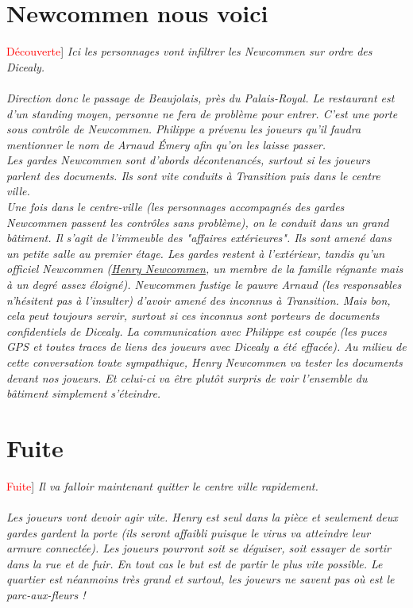 \documentclass[10pt,a4paper,twocolumn]{article}
\newenvironment{lAbstract}[1]{{[}\textcolor{red}{#1}{]}\itshape}{\\ \\}
\begin{document}
\section{Newcommen nous voici}
\begin{lAbstract}{Découverte}
Ici les personnages vont infiltrer les Newcommen sur ordre des Dicealy.
\end{lAbstract}
Direction donc le passage de Beaujolais, près du Palais-Royal. Le restaurant est d'un standing moyen, personne ne fera de problème pour entrer. C'est une porte sous contrôle de Newcommen. Philippe a prévenu les joueurs qu'il faudra mentionner le nom de Arnaud Émery afin qu'on les laisse passer. \\
Les gardes Newcommen sont d'abords décontenancés, surtout si les joueurs parlent des documents. Ils sont vite conduits à Transition puis dans le centre ville.
\\
Une fois dans le centre-ville (les personnages accompagnés des gardes Newcommen passent les contrôles sans problème), on le conduit dans un grand bâtiment. Il s'agit de l'immeuble des "affaires extérieures". Ils sont amené dans un petite salle au premier étage. Les gardes restent à l'extérieur, tandis qu'un officiel Newcommen (\hyperlink{henry}{Henry Newcommen}, un membre de la famille régnante mais à un degré assez éloigné).
Newcommen fustige le pauvre Arnaud (les responsables n'hésitent pas à l'insulter) d'avoir amené des inconnus à Transition. Mais bon, cela peut toujours servir, surtout si ces inconnus sont porteurs de documents confidentiels de Dicealy. La communication avec Philippe est coupée (les puces GPS et toutes traces de liens des joueurs avec Dicealy a été effacée).
Au milieu de cette conversation toute sympathique, Henry Newcommen va tester les documents devant nos joueurs. Et celui-ci va être plutôt surpris de voir l'ensemble du bâtiment simplement s'éteindre.

\section{Fuite}
\begin{lAbstract}{Fuite}
Il va falloir maintenant quitter le centre ville rapidement.
\end{lAbstract}
Les joueurs vont devoir agir vite. Henry est seul dans la pièce et seulement deux gardes gardent la porte (ils seront affaibli puisque le virus va atteindre leur armure connectée). Les joueurs pourront soit se déguiser, soit essayer de sortir dans la rue et de fuir. En tout cas le but est de partir le plus vite possible. Le quartier est néanmoins très grand et surtout, les joueurs ne savent pas où est le parc-aux-fleurs !
\end{document}
